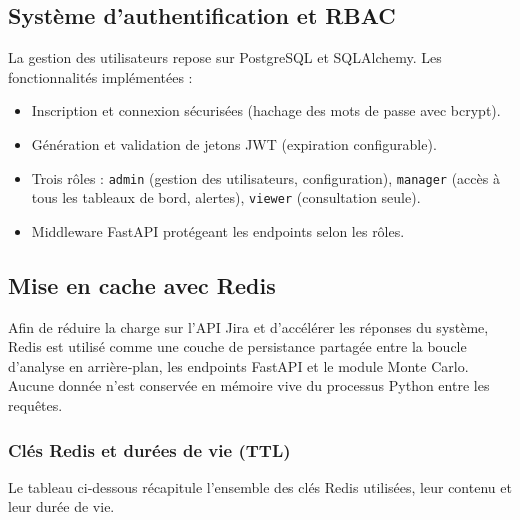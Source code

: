 \subsection{Système d’authentification et RBAC}
La gestion des utilisateurs repose sur PostgreSQL et SQLAlchemy. Les fonctionnalités implémentées :
\begin{itemize}
    \renewcommand{\labelitemi}{—}
    \item Inscription et connexion sécurisées (hachage des mots de passe avec bcrypt).
    \item Génération et validation de jetons JWT (expiration configurable).
    \item Trois rôles : \texttt{admin} (gestion des utilisateurs, configuration), \texttt{manager} (accès à tous les tableaux de bord, alertes), \texttt{viewer} (consultation seule).
    \item Middleware FastAPI protégeant les endpoints selon les rôles.
\end{itemize}

\subsection{Mise en cache avec Redis}

Afin de réduire la charge sur l’API Jira et d’accélérer les réponses du système, Redis est utilisé comme une couche de persistance partagée entre la boucle d’analyse en arrière‑plan, les endpoints FastAPI et le module Monte Carlo. Aucune donnée n’est conservée en mémoire vive du processus Python entre les requêtes.

\subsubsection*{Clés Redis et durées de vie (TTL)}

Le tableau ci‑dessous récapitule l’ensemble des clés Redis utilisées, leur contenu et leur durée de vie.

